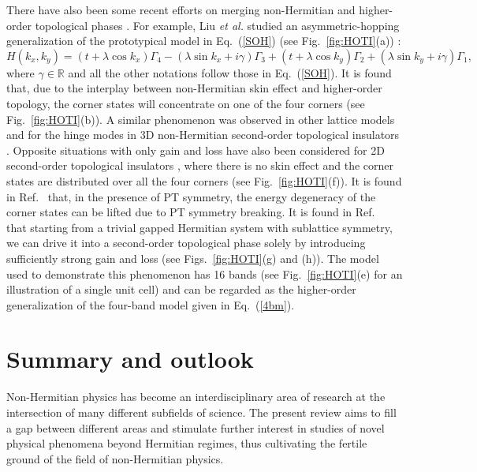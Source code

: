 \documentclass{tADP2e}
\theoremstyle{plain}
\theoremstyle{plain}
\theoremstyle{definition}
\begin{document}
There have also been some recent efforts on merging non-Hermitian and higher-order topological phases \cite{LT19,LL19,EE19,EM19a,EM19b,ZZ19,LXW19}. For example, Liu \emph{et al.} studied an asymmetric-hopping generalization of the prototypical model in Eq.~(\ref{SOH}) (see Fig.~\ref{fig:HOTI}(a)) \cite{LT19}:
\begin{equation}
H(k_x,k_y)=(t+\lambda\cos k_x)\Gamma_4-(\lambda\sin k_x+i\gamma)\Gamma_3+(t+\lambda\cos k_y)\Gamma_2+(\lambda\sin k_y+i\gamma)\Gamma_1,
\label{NHSOH}
\end{equation}
where $\gamma\in\mathbb{R}$ and all the other notations follow those in Eq.~(\ref{SOH}). It is found that, due to the interplay between non-Hermitian skin effect and higher-order topology, the corner states will concentrate on one of the four corners (see Fig.~\ref{fig:HOTI}(b)). A similar phenomenon was observed in other lattice models \cite{LL19,EE19,EM19a,EM19b} and for the hinge modes in 3D non-Hermitian second-order topological insulators \cite{LT19}. 
Opposite situations with only gain and loss have also been considered for 2D second-order topological insulators \cite{ZZ19,LXW19}, where there is no skin effect and the corner states are distributed over all the four corners (see Fig.~\ref{fig:HOTI}(f)). It is found in Ref.~\cite{ZZ19} that, in the presence of PT symmetry, the energy degeneracy of the corner states can be lifted due to PT symmetry breaking. It is found in Ref.~\cite{LXW19} that starting from a trivial gapped Hermitian system with sublattice symmetry, we can drive it into a second-order topological phase solely by introducing sufficiently strong gain and loss (see Figs.~\ref{fig:HOTI}(g) and (h)). The model used to demonstrate this phenomenon has 16 bands (see Fig.~\ref{fig:HOTI}(e) for an illustration of a single unit cell) and can be regarded as the higher-order generalization of the four-band model given in Eq.~(\ref{4bm}).  


\section{Summary and outlook\label{sec7}}
Non-Hermitian physics has become an interdisciplinary area of research at the intersection of many different subfields of science. The present review aims to fill a gap between different areas and stimulate further interest in studies of novel physical phenomena beyond Hermitian regimes, thus cultivating the fertile ground of the field of non-Hermitian physics. 
\end{document}
